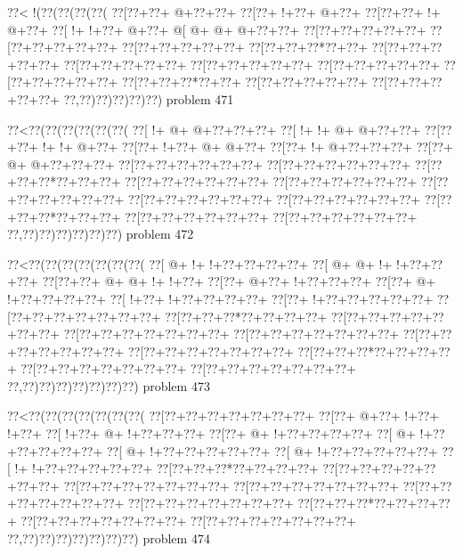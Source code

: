 \vbox{\vbox{\goo
\0??<\- !(\0??(\0??(\0??(\0??(
\0??[\0??+\0??+\- @+\0??+\0??+
\0??[\0??+\- !+\0??+\- @+\0??+
\0??[\0??+\0??+\- !+\- @+\0??+
\0??[\- !+\- !+\0??+\- @+\0??+
\- @[\- @+\- @+\- @+\0??+\0??+
\0??[\0??+\0??+\0??+\0??+\0??+
\0??[\0??+\0??+\0??+\0??+\0??+
\0??[\0??+\0??+\0??+\0??+\0??+
\0??[\0??+\0??+\0??*\0??+\0??+
\0??[\0??+\0??+\0??+\0??+\0??+
\0??[\0??+\0??+\0??+\0??+\0??+
\0??[\0??+\0??+\0??+\0??+\0??+
\0??[\0??+\0??+\0??+\0??+\0??+
\0??[\0??+\0??+\0??+\0??+\0??+
\0??[\0??+\0??+\0??*\0??+\0??+
\0??[\0??+\0??+\0??+\0??+\0??+
\0??[\0??+\0??+\0??+\0??+\0??+
\0??,\0??)\0??)\0??)\0??)\0??)
}
\hfil problem 471\hfil\break
}

\vbox{\vbox{\goo
\0??<\0??(\0??(\0??(\0??(\0??(\0??(
\0??[\- !+\- @+\- @+\0??+\0??+\0??+
\0??[\- !+\- !+\- @+\- @+\0??+\0??+
\0??[\0??+\0??+\- !+\- !+\- @+\0??+
\0??[\0??+\- !+\0??+\- @+\- @+\0??+
\0??[\0??+\- !+\- @+\0??+\0??+\0??+
\0??[\0??+\- @+\- @+\0??+\0??+\0??+
\0??[\0??+\0??+\0??+\0??+\0??+\0??+
\0??[\0??+\0??+\0??+\0??+\0??+\0??+
\0??[\0??+\0??+\0??*\0??+\0??+\0??+
\0??[\0??+\0??+\0??+\0??+\0??+\0??+
\0??[\0??+\0??+\0??+\0??+\0??+\0??+
\0??[\0??+\0??+\0??+\0??+\0??+\0??+
\0??[\0??+\0??+\0??+\0??+\0??+\0??+
\0??[\0??+\0??+\0??+\0??+\0??+\0??+
\0??[\0??+\0??+\0??*\0??+\0??+\0??+
\0??[\0??+\0??+\0??+\0??+\0??+\0??+
\0??[\0??+\0??+\0??+\0??+\0??+\0??+
\0??,\0??)\0??)\0??)\0??)\0??)\0??)
}
\hfil problem 472\hfil\break
}

\vbox{\vbox{\goo
\0??<\0??(\0??(\0??(\0??(\0??(\0??(\0??(
\0??[\- @+\- !+\- !+\0??+\0??+\0??+\0??+
\0??[\- @+\- @+\- !+\- !+\0??+\0??+\0??+
\0??[\0??+\0??+\- @+\- @+\- !+\- !+\0??+
\0??[\0??+\- @+\0??+\- !+\0??+\0??+\0??+
\0??[\0??+\- @+\- !+\0??+\0??+\0??+\0??+
\0??[\- !+\0??+\- !+\0??+\0??+\0??+\0??+
\0??[\0??+\- !+\0??+\0??+\0??+\0??+\0??+
\0??[\0??+\0??+\0??+\0??+\0??+\0??+\0??+
\0??[\0??+\0??+\0??*\0??+\0??+\0??+\0??+
\0??[\0??+\0??+\0??+\0??+\0??+\0??+\0??+
\0??[\0??+\0??+\0??+\0??+\0??+\0??+\0??+
\0??[\0??+\0??+\0??+\0??+\0??+\0??+\0??+
\0??[\0??+\0??+\0??+\0??+\0??+\0??+\0??+
\0??[\0??+\0??+\0??+\0??+\0??+\0??+\0??+
\0??[\0??+\0??+\0??*\0??+\0??+\0??+\0??+
\0??[\0??+\0??+\0??+\0??+\0??+\0??+\0??+
\0??[\0??+\0??+\0??+\0??+\0??+\0??+\0??+
\0??,\0??)\0??)\0??)\0??)\0??)\0??)\0??)
}
\hfil problem 473\hfil\break
}

\vbox{\vbox{\goo
\0??<\0??(\0??(\0??(\0??(\0??(\0??(\0??(
\0??[\0??+\0??+\0??+\0??+\0??+\0??+\0??+
\0??[\0??+\- @+\0??+\- !+\0??+\- !+\0??+
\0??[\- !+\0??+\- @+\- !+\0??+\0??+\0??+
\0??[\0??+\- @+\- !+\0??+\0??+\0??+\0??+
\0??[\- @+\- !+\0??+\0??+\0??+\0??+\0??+
\0??[\- @+\- !+\0??+\0??+\0??+\0??+\0??+
\0??[\- @+\- !+\0??+\0??+\0??+\0??+\0??+
\0??[\- !+\- !+\0??+\0??+\0??+\0??+\0??+
\0??[\0??+\0??+\0??*\0??+\0??+\0??+\0??+
\0??[\0??+\0??+\0??+\0??+\0??+\0??+\0??+
\0??[\0??+\0??+\0??+\0??+\0??+\0??+\0??+
\0??[\0??+\0??+\0??+\0??+\0??+\0??+\0??+
\0??[\0??+\0??+\0??+\0??+\0??+\0??+\0??+
\0??[\0??+\0??+\0??+\0??+\0??+\0??+\0??+
\0??[\0??+\0??+\0??*\0??+\0??+\0??+\0??+
\0??[\0??+\0??+\0??+\0??+\0??+\0??+\0??+
\0??[\0??+\0??+\0??+\0??+\0??+\0??+\0??+
\0??,\0??)\0??)\0??)\0??)\0??)\0??)\0??)
}
\hfil problem 474\hfil\break
}

